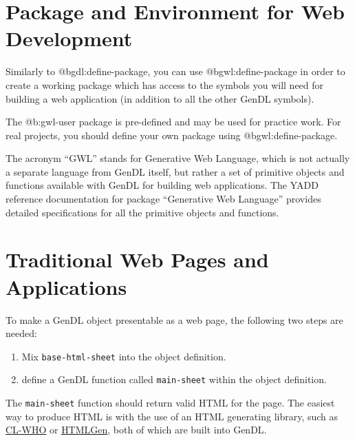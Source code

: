 \documentclass [11pt]{book}
\begin{document}
\section{Package and Environment for Web Development}

\label{sec:packageandenvironmentforwebdevelopment}



Similarly to @b{gdl:define-package}, you can use
@b{gwl:define-package} in order to create a working package which has
access to the symbols you will need for building a web application (in
addition to all the other GenDL symbols).



The @b{:gwl-user} package is pre-defined and may be used for practice
work. For real projects, you should define your own package using
@b{gwl:define-package}.



The acronym ``GWL'' stands for Generative Web Language, which is not
actually a separate language from GenDL itself, but rather a set of
primitive objects and functions available with GenDL for building web
applications. The YADD reference documentation for package
``Generative Web Language'' provides detailed specifications for all
the primitive objects and functions.



\section{Traditional Web Pages and Applications}

\label{sec:traditionalwebpagesandapplications}



To make a GenDL object presentable as a web page, the following two
steps are needed:

\begin{enumerate}

\item Mix \texttt{base-html-sheet} into the object definition.

\item define a GenDL function called \texttt{main-sheet} within the object definition.

\end{enumerate}

The \texttt{main-sheet} function should return valid
HTML for the page. The easiest way to produce HTML is with the use of
an HTML generating library, such as \href{http://weitz.de/cl-who}{CL-WHO} or \href{http://www.franz.com/support/documentation/current/doc/aserve/htmlgen.html}{HTMLGen}, both of which are built into GenDL.
\end{document}
